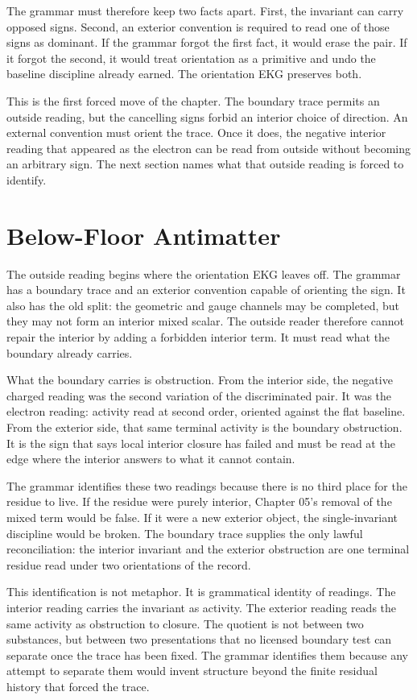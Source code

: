 The grammar must therefore keep two facts apart. First, the invariant can
carry opposed signs. Second, an exterior convention is required to read one
of those signs as dominant. If the grammar forgot the first fact, it would
erase the pair. If it forgot the second, it would treat orientation as a
primitive and undo the baseline discipline already earned. The orientation
EKG preserves both.

This is the first forced move of the chapter. The boundary trace permits an
outside reading, but the cancelling signs forbid an interior choice of
direction. An external convention must orient the trace. Once it does, the
negative interior reading that appeared as the electron can be read from
outside without becoming an arbitrary sign. The next section names what that
outside reading is forced to identify.

\section{Below-Floor Antimatter}

The outside reading begins where the orientation EKG leaves off. The grammar
has a boundary trace and an exterior convention capable of orienting the
sign. It also has the old split: the geometric and gauge channels may be
completed, but they may not form an interior mixed scalar. The outside reader
therefore cannot repair the interior by adding a forbidden interior term. It
must read what the boundary already carries.

What the boundary carries is obstruction. From the interior side, the
negative charged reading was the second variation of the discriminated pair.
It was the electron reading: activity read at second order, oriented against
the flat baseline. From the exterior side, that same terminal activity is the
boundary obstruction. It is the sign that says local interior closure has
failed and must be read at the edge where the interior answers to what it
cannot contain.

The grammar identifies these two readings because there is no third place
for the residue to live. If the residue were purely interior, Chapter 05's
removal of the mixed term would be false. If it were a new exterior object,
the single-invariant discipline would be broken. The boundary trace supplies
the only lawful reconciliation: the interior invariant and the exterior
obstruction are one terminal residue read under two orientations of the
record.

This identification is not metaphor. It is grammatical identity of readings.
The interior reading carries the invariant as activity. The exterior reading
reads the same activity as obstruction to closure. The quotient is not between
two substances, but between two presentations that no licensed boundary test
can separate once the trace has been fixed. The grammar identifies them
because any attempt to separate them would invent structure beyond the finite
residual history that forced the trace.

